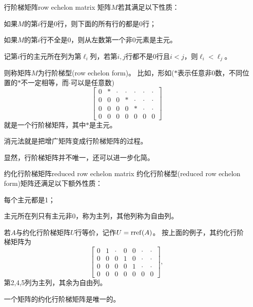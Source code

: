 \begin{definition}{行阶梯矩阵}{row echelon matrix}
	矩阵$M$若其满足以下性质：
	\begin{compactitem}
		\item 如果$M$的第$i$行是0行，则下面的所有行的都是0行；
		\item 如果$M$的第$i$行不全是0，则从左数第一个非0元素是主元。
		\item 记第$i$行的主元所在列为第$\ell_i$列，若第$i,j$行都不是0行且$i<j$，则$\ell_i<\ell_j$。
	\end{compactitem}
	则称矩阵$M$为行阶梯型(row echelon form)。
	\tcblower
	比如，形如($\ast$表示任意非0数，不同位置的$\ast$不一定相等，而$\cdot$可以是任意数)
	\[
		\begin{bmatrix}
			0&\ast&\cdot&\cdot&\cdot&\cdot&\cdot\\
			0&0&0&\ast&\cdot&\cdot&\cdot\\
			0&0&0&0&\ast&\cdot&\cdot\\
			0&0&0&0&0&0&0
		\end{bmatrix}
	\]
	就是一个行阶梯矩阵，其中$\ast$是主元。
\end{definition}
\begin{remark}
	消元法就是把增广矩阵变成行阶梯矩阵的过程。
\end{remark}

显然，行阶梯矩阵并不唯一，还可以进一步化简。

\begin{definition}{约化行阶梯矩阵}{reduced row echelon matrix}
	约化行阶梯型(reduced row echelon form)矩阵还满足以下额外性质：
	\begin{compactitem}
		\item 每个主元都是1；
		\item 主元所在列只有主元非0，称为主列，其他列称为自由列。
	\end{compactitem}
	若$A$与约化行阶梯矩阵$U$行等价，记作$U=\operatorname{rref}(A)$。
	\tcblower
	按上面的例子，其约化行阶梯矩阵为
	\[
		\begin{bmatrix}
			0&1&\cdot&0&0&\cdot&\cdot\\
			0&0&0&1&0&\cdot&\cdot\\
			0&0&0&0&1&\cdot&\cdot\\
			0&0&0&0&0&0&0
		\end{bmatrix},
	\]
	第2,4,5列为主列，其余为自由列。
\end{definition}
\begin{theorem}
	{}{}
	一个矩阵的约化行阶梯矩阵是唯一的。
\end{theorem}

